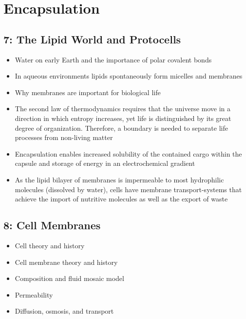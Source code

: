 \documentclass[
]{report}
\providecommand{\tightlist}{%
  \setlength{\itemsep}{0pt}\setlength{\parskip}{0pt}}
\providecommand{\tightlist}{%
  \setlength{\itemsep}{0pt}\setlength{\parskip}{0pt}}
\begin{document}
\hypertarget{encapsulation}{%
\chapter{Encapsulation}\label{encapsulation}}

\hypertarget{the-lipid-world-and-protocells}{%
\section*{7: The Lipid World and Protocells}\label{the-lipid-world-and-protocells}}

\begin{itemize}
\tightlist
\item
  Water on early Earth and the importance of polar covalent bonds
\item
  In aqueous environments lipids spontaneously form micelles and membranes
\item
  Why membranes are important for biological life
\item
  The second law of thermodynamics requires that the universe move in a direction in which entropy increases, yet life is distinguished by its great degree of organization. Therefore, a boundary is needed to separate life processes from non-living matter
\item
  Encapsulation enables increased solubility of the contained cargo within the capsule and storage of energy in an electrochemical gradient
\item
  As the lipid bilayer of membranes is impermeable to most hydrophilic molecules (dissolved by water), cells have membrane transport-systems that achieve the import of nutritive molecules as well as the export of waste
\end{itemize}

\hypertarget{cell-membranes}{%
\section*{8: Cell Membranes}\label{cell-membranes}}

\begin{itemize}
\tightlist
\item
  Cell theory and history
\item
  Cell membrane theory and history
\item
  Composition and fluid mosaic model
\item
  Permeability
\item
  Diffusion, osmosis, and transport
\end{itemize}
\end{document}
